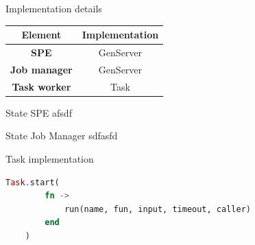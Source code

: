 \documentclass{beamer}
\begin{document}
\begin{frame}{Implementation details}

    \begin{table}[]
        \centering
        \begin{tabular}{|c|c|}
        \hline
        Element & Implementation \\
        \hline
        \hline
        \hline
        \textbf{SPE} & GenServer \\
        \textbf{Job manager} & GenServer \\
        \textbf{Task worker} & Task \\
        \hline
        \end{tabular}
    \end{table}
    
\end{frame}


\begin{frame}{State SPE}
    afsdf
\end{frame}

\begin{frame}{State Job Manager}
    sdfasfd
\end{frame}

\begin{frame}[fragile]{Task implementation}

\begin{lstlisting}[language=elixir]
    Task.start(
        fn -> 
            run(name, fun, input, timeout, caller) 
        end
    )
\end{lstlisting}
   
\end{frame}
\end{document}
